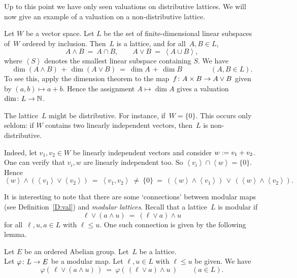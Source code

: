 \documentclass[main.tex]{subfiles}
\begin{document}
%
%
\noindent
Up to this point
we have only seen valuations on distributive lattices.
We will now give an example
of a valuation on a non-distributive lattice.
\begin{ex}
Let $W$ be a vector space.
Let $L$ be the set of finite-dimensional linear subspaces
of~$W$ ordered by inclusion.
  Then~$L$ is a lattice, and 
for all~$A,B\in L$,
\begin{equation*}
A\wedge B \ =\ A\cap B,
\qquad A\vee B \ =\ \left<A\cup B\right>,
\end{equation*}
where $\left< S \right>$ denotes the smallest
linear subspace containing $S$.
We have
\begin{equation*}
\dim (A\wedge B) \,+\, \dim(A\vee B)
\ =\ 
\dim A \,+\, \dim B 
\qquad\qquad(A,B\in L).
\end{equation*}
To see this,
apply the dimension theorem
to the map~$f\colon A\times B\rightarrow A\vee B$ given by  $(a,b)\mapsto a+b$.
Hence the assignment $A \mapsto \dim A$
gives a valuation $\dim\colon L\rightarrow \mathbb{N}$.

The lattice~$L$ might be distributive.
For instance, if~$W=\{ 0 \}$.
This occurs only seldom:
if $W$ contains two linearly independent vectors,
then~$L$ is non-distributive.

Indeed,
let $v_1,v_2\in W$ be linearly independent vectors
and consider  $w:= v_1 + v_2$.
One can verify that $v_i, w$ are linearly independent too.
So $\left< v_i \right> \cap \left< w \right> = \{0\}$.
Hence
\begin{equation*}
\left< w \right> \wedge(\left< v_1 \right>\vee\left< v_2 \right>)
\ =\ 
\left< v_1, v_2 \right>
\ \neq\ 
\{0\}
\ =\ 
(\left<w\right> \wedge \left<v_1\right>)
\,\vee\, (\left<w\right> \wedge \left<v_2\right>).
\end{equation*}
\end{ex}
\noindent
It is interesting to note that
there are some `connections'
between
modular maps (see Definition~\ref{D:val})
and \emph{modular lattices}.
Recall that a lattice~$L$ is modular if
\begin{equation*}
\ell \vee (a \wedge u) \ =\ (\ell \vee a) \wedge u
\end{equation*}
for all~$\ell,u,a \in L$ with $\ell \leq u$.
One such connection is given by the following lemma.
%
%
\begin{lem}
\label{L:modular-map-modular}
Let $E$ be an ordered Abelian group.
Let~$L$ be a lattice.\\
Let $\varphi\colon L \rightarrow E$ 
be a modular map.
Let $\ell,u\in L$ with $\ell\leq u$ be given.
We have
\begin{equation}
\label{eq:modular-map}
\varphi(\,\ell \vee (a \wedge u)\,) 
\ =\ 
\varphi(\,(\ell\vee a)\wedge u\,)
\qquad (a\in L).
\end{equation}
\end{lem}
\end{document}
